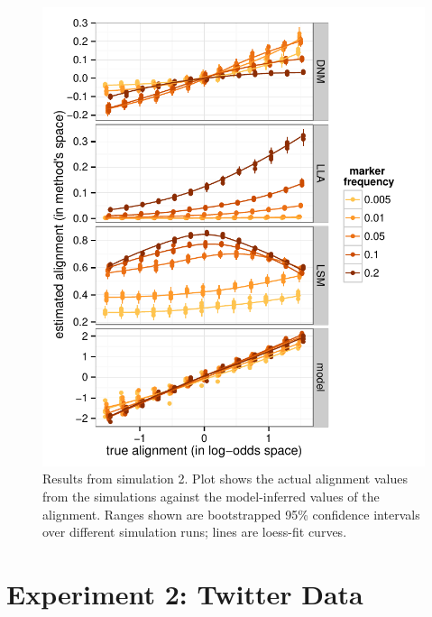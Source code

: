 \documentclass{acm_proc_article-sp}
\begin{document}
\begin{figure}[t]
\centering
\includegraphics[width=\columnwidth]{graphics/www2016_simulation2b_crossiter.pdf}
\caption{Results from simulation 2. Plot shows the actual alignment values from the simulations against the model-inferred values of the alignment. Ranges shown are bootstrapped 95\% confidence intervals over different simulation runs; lines are loess-fit curves.}\label{fig:sim2}
\end{figure}




\section{Experiment 2: Twitter Data}
\end{document}
